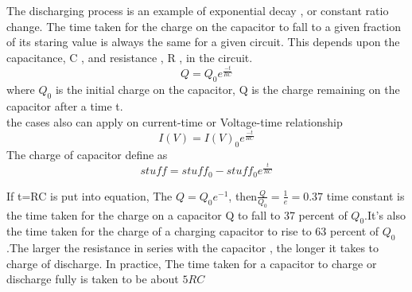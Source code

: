 \documentclass[a4paper]{article}
\begin{document}
\begin{defi}
The discharging process is an example of exponential decay , or constant ratio change. The time taken for the charge on the capacitor to fall to a given fraction of its staring value is always the same for a given circuit. This depends upon the capacitance, C , and resistance , R , in the circuit.
\begin{equation*}
    Q=Q_0e^{\frac{-t}{RC}}
\end{equation*}
where $Q_0$ is the initial charge on the capacitor, Q is the charge remaining on the capacitor after a time t.\\
the cases also can apply on current-time or Voltage-time relationship
\begin{equation*}
    I(V)=I(V)_0e^{\frac{-t}{RC}}
\end{equation*}
The charge of capacitor define as
\begin{equation*}
    stuff=stuff_0-stuff_0e^{\frac{t}{RC}}
\end{equation*}
\end{defi}
\begin{defi}
If t=RC is put into equation, The $Q=Q_0e^{-1}$, then$\frac{Q}{Q_0}=\frac{1}{e}=0.37$
time constant is the time taken for the charge on a capacitor Q to fall to 37 percent of $Q_0$.It's also the time taken for the charge of a charging capacitor to rise to 63 percent of $Q_0$.The larger the resistance in series with the capacitor , the longer it takes to charge of discharge. In practice, The time taken for a capacitor to charge or discharge fully is taken to be about $5RC$  
\end{defi}
\end{document}
